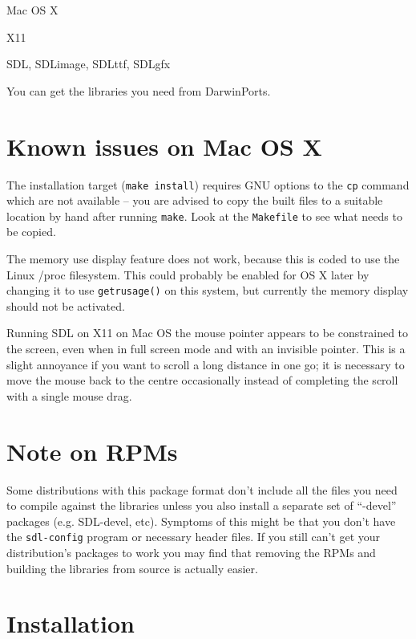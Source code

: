 \documentclass[12pt,a4paper,twoside]{article}
\renewcommand{\_}{\texttt{\symbol{95}}}
\begin{document}
\begin{bulletlist}
\item Mac OS X
\item X11
\item SDL, SDL\_image, SDL\_ttf, SDL\_gfx
\end{bulletlist}

You can get the libraries you need from DarwinPorts.

\section{Known issues on Mac OS X}

The installation target (\verb^make install^) requires GNU options to
the \verb^cp^ command which are not available -- you are advised to copy
the built files to a suitable location by hand after running \verb^make^.
Look at the \verb^Makefile^ to see what needs to be copied.

The memory use display feature does not work, because this is coded to use the
Linux /proc filesystem. This could probably be enabled for OS X later by
changing it to use \verb=getrusage()= on this system, but currently the memory
display should not be activated.

Running SDL on X11 on Mac OS the mouse pointer appears to be constrained to the
screen, even when in full screen mode and with an invisible pointer. This is a
slight annoyance if you want to scroll a long distance in one go; it is
necessary to move the mouse back to the centre occasionally instead of
completing the scroll with a single mouse drag.

\section{Note on RPMs}

Some distributions with this package format don't include all the files you
need to compile against the libraries unless you also install a separate set of
``-devel'' packages (e.g. SDL-devel, etc). Symptoms of this might be that you
don't have the \verb=sdl-config= program or necessary header files. If you still
can't get your distribution's packages to work you may find that removing the
RPMs and building the libraries from source is actually easier.

\section{Installation}
\end{document}
